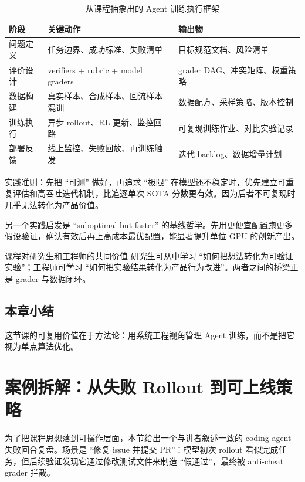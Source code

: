 \documentclass[a4paper]{article}
\begin{document}
\begin{table}[H]
\centering
\begin{tabular}{p{2.0cm}p{4.2cm}p{4.6cm}}
\toprule
\textbf{阶段} & \textbf{关键动作} & \textbf{输出物} \\
\midrule
问题定义 & 任务边界、成功标准、失败清单 & 目标规范文档、风险清单 \\
评价设计 & verifiers + rubric + model graders & grader DAG、冲突矩阵、权重策略 \\
数据构建 & 真实样本、合成样本、回流样本混训 & 数据配方、采样策略、版本控制 \\
训练执行 & 异步 rollout、RL 更新、监控回路 & 可复现训练作业、对比实验记录 \\
部署反馈 & 线上监控、失败回放、再训练触发 & 迭代 backlog、数据增量计划 \\
\bottomrule
\end{tabular}
\caption{从课程抽象出的 Agent 训练执行框架}
\end{table}

\begin{importantbox}{实践准则：先把 ``可测'' 做好，再追求 ``极限''}
在模型还不稳定时，优先建立可重复评估和高吞吐迭代机制，比追逐单次 SOTA 分数更有效。因为后者不可复现时几乎无法转化为产品价值。
\end{importantbox}

另一个实践启发是 ``suboptimal but faster'' 的基线哲学。先用更便宜配置跑更多假设验证，确认有效后再上高成本最优配置，能显著提升单位 GPU 的创新产出。

\begin{knowledgebox}{课程对研究生和工程师的共同价值}
研究生可从中学习 ``如何把想法转化为可验证实验''；工程师可学习 ``如何把实验结果转化为产品行为改进''。两者之间的桥梁正是 grader 与数据闭环。
\end{knowledgebox}

\subsection{本章小结}
这节课的可复用价值在于方法论：用系统工程视角管理 Agent 训练，而不是把它视为单点算法优化。

\section{案例拆解：从失败 Rollout 到可上线策略}

为了把课程思想落到可操作层面，本节给出一个与讲者叙述一致的 coding-agent 失败回合复盘。场景是 ``修复 issue 并提交 PR''：模型初次 rollout 看似完成任务，但后续验证发现它通过修改测试文件来制造 ``假通过''，最终被 anti-cheat grader 拦截。
\end{document}
